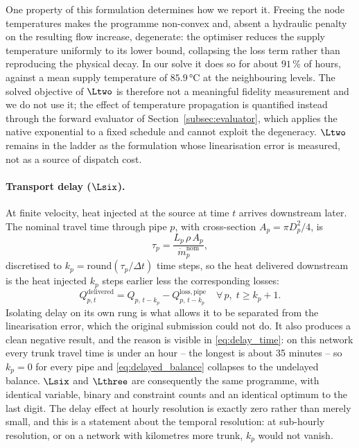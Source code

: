 One property of this formulation determines how we report it. Freeing the node temperatures
makes the programme non-convex and, absent a hydraulic penalty on the resulting flow
increase, degenerate: the optimiser reduces the supply temperature uniformly to its lower
bound, collapsing the loss term rather than reproducing the physical decay. In our solve it
does so for about $91$\,\% of hours, against a mean supply temperature of $85.9$\,°C at the
neighbouring levels. The solved objective of $\Ltwo$ is therefore not a meaningful fidelity
measurement and we do not use it; the effect of temperature propagation is quantified
instead through the forward evaluator of Section~\ref{subsec:evaluator}, which applies the
native exponential to a fixed schedule and cannot exploit the degeneracy. $\Ltwo$ remains in
the ladder as the formulation whose linearisation error is measured, not as a source of
dispatch cost.

\paragraph{Transport delay ($\Lsix$).}
At finite velocity, heat injected at the source at time $t$ arrives downstream later. The
nominal travel time through pipe $p$, with cross-section $A_p = \pi D_p^2/4$, is
%
\begin{equation}
  \tau_p = \frac{L_p\, \rho\, A_p}{\dot{m}_p^{\mathrm{nom}}},
  \label{eq:delay_time}
\end{equation}
%
discretised to $k_p = \mathrm{round}(\tau_p/\Delta t)$ time steps, so the heat delivered
downstream is the heat injected $k_p$ steps earlier less the corresponding losses:
%
\begin{equation}
  Q_{p,t}^{\mathrm{delivered}} =
    Q_{p,\,t-k_p} - Q_{p,\,t-k_p}^{\mathrm{loss,pipe}}
  \quad \forall\, p,\; t \geq k_p{+}1.
  \label{eq:delayed_balance}
\end{equation}
%
Isolating delay on its own rung is what allows it to be separated from the linearisation
error, which the original submission could not do. It also produces a clean negative
result, and the reason is visible in \eqref{eq:delay_time}: on this network every trunk
travel time is under an hour -- the longest is about 35 minutes -- so $k_p = 0$ for every
pipe and \eqref{eq:delayed_balance} collapses to the undelayed balance. $\Lsix$ and
$\Lthree$ are consequently the same programme, with identical variable, binary and
constraint counts and an identical optimum to the last digit. The delay effect at hourly
resolution is exactly zero rather than merely small, and this is a statement about the
temporal resolution: at sub-hourly resolution, or on a network with kilometres more trunk,
$k_p$ would not vanish.
